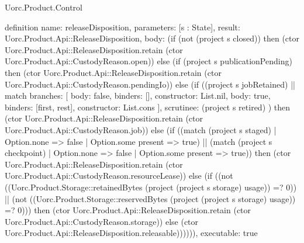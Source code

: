 \begin{lexlean}{Uorc.Product.Control}
\begin{semanticmodule}
definition{
  name: releaseDisposition,
  parameters: [s : State],
  result: Uorc.Product.Api::ReleaseDisposition,
  body: (if (not (project s closed)) then (ctor Uorc.Product.Api::ReleaseDisposition.retain (ctor Uorc.Product.Api::CustodyReason.open)) else (if (project s publicationPending) then (ctor Uorc.Product.Api::ReleaseDisposition.retain (ctor Uorc.Product.Api::CustodyReason.pendingIo)) else (if ((project s jobRetained) || match{
    branches: [
      {body: false, binders: [], constructor: List.nil},
      {body: true, binders: [first, rest], constructor: List.cons}
    ],
    scrutinee: (project s retired)
  }) then (ctor Uorc.Product.Api::ReleaseDisposition.retain (ctor Uorc.Product.Api::CustodyReason.job)) else (if ((match (project s staged)
    | Option.none => false
    | Option.some present => true) || (match (project s checkpoint)
    | Option.none => false
    | Option.some present => true)) then (ctor Uorc.Product.Api::ReleaseDisposition.retain (ctor Uorc.Product.Api::CustodyReason.resourceLease)) else (if ((not ((Uorc.Product.Storage::retainedBytes (project (project s storage) usage)) =? 0)) || (not ((Uorc.Product.Storage::reservedBytes (project (project s storage) usage)) =? 0))) then (ctor Uorc.Product.Api::ReleaseDisposition.retain (ctor Uorc.Product.Api::CustodyReason.storage)) else (ctor Uorc.Product.Api::ReleaseDisposition.releasable)))))),
  executable: true
}
\end{semanticmodule}
\end{lexlean}
